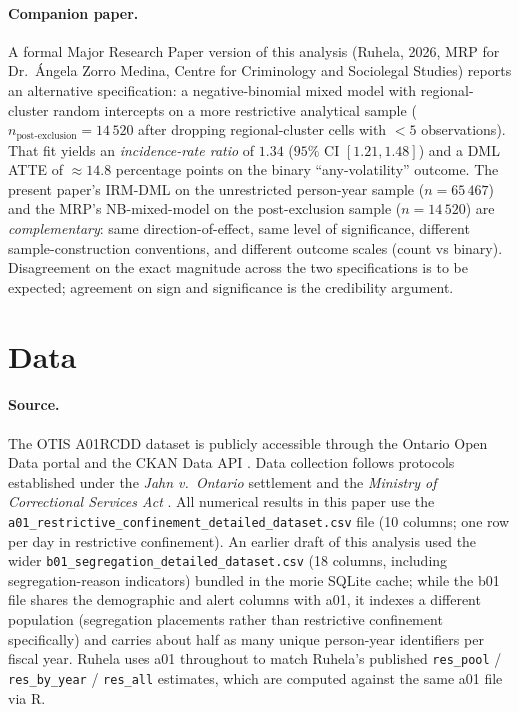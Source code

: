 \documentclass[11pt,a4paper]{article}
\newcommand{\1}{\mathbf{1}}
\theoremstyle{plain}
\theoremstyle{definition}
\begin{document}
\paragraph{Companion paper.}  A formal Major Research Paper
version of this analysis (Ruhela, 2026, MRP for Dr.~Ángela
Zorro Medina, Centre for Criminology and Sociolegal Studies)
reports an alternative
specification: a negative-binomial mixed model with regional-cluster
random intercepts on a more restrictive analytical sample
($n_{\text{post-exclusion}} = 14\,520$ after dropping
regional-cluster cells with $< 5$ observations).  That fit yields
an \emph{incidence-rate ratio} of $1.34$ ($95\%$ CI $[1.21, 1.48]$)
and a DML ATTE of $\approx 14.8$ percentage points on the binary
``any-volatility'' outcome.  The present paper's IRM-DML on the
unrestricted person-year sample ($n=65\,467$) and the MRP's
NB-mixed-model on the post-exclusion sample ($n=14\,520$) are
\emph{complementary}: same direction-of-effect, same level of
significance, different sample-construction conventions, and
different outcome scales (count vs binary).  Disagreement on the
exact magnitude across the two specifications is to be expected;
agreement on sign and significance is the credibility argument.

\section{Data}\label{sec:data}

\paragraph{Source.}  The OTIS A01RCDD dataset is publicly accessible
through the Ontario Open Data portal and the CKAN Data API
\cite{Ontario_CKAN_API_2025}.  Data collection follows protocols
established under the \emph{Jahn v.\ Ontario} settlement
\cite{Ontario_JahnSettlement_2025} and the \emph{Ministry of
Correctional Services Act} \cite{Ontario_MCSCS_Act}.  All numerical
results in this paper use the
\texttt{a01\_restrictive\_confinement\_detailed\_dataset.csv} file
(10 columns; one row per day in restrictive confinement).  An
earlier draft of this analysis used the wider
\texttt{b01\_segregation\_detailed\_dataset.csv} (18 columns,
including segregation-reason indicators) bundled in the morie
SQLite cache; while the b01 file shares the demographic and alert
columns with a01, it indexes a different population (segregation
placements rather than restrictive confinement specifically) and
carries about half as many unique person-year identifiers per
fiscal year.  Ruhela uses a01 throughout to match Ruhela's published
\texttt{res\_pool} / \texttt{res\_by\_year} / \texttt{res\_all}
estimates, which are computed against the same a01 file via R.
\end{document}
